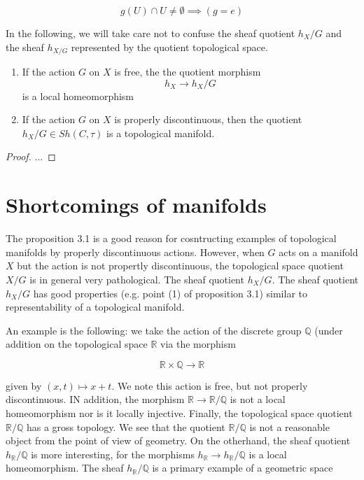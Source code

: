 \documentclass[../main.tex]{subfiles}
\begin{document}
\[
    g(U) \cap U \ne \emptyset \implies (g = e)
\]

In the following, we will take care not to confuse the sheaf quotient $h_X/G$ and the sheaf $h_{X/G}$ represented by the quotient topological space.

\begin{prop}
    \begin{enumerate}
            \item If the action $G$ on $X$ is free, the the quotient morphism
            \[h_X \to h_X/G\] is a local homeomorphism
            \item If the action $G$ on $X$ is properly discontinuous, then the quotient $h_X/G \in Sh(C, \tau)$ is a topological manifold.
    \end{enumerate}
\end{prop}
\begin{proof}
...
\end{proof}

\section{Shortcomings of manifolds}

The proposition 3.1 is a good reason for cosntructing examples of topological manifolds by properly discontinuous actions. However, when $G$ acts on a manifold $X$ but the action is not propertly discontinuous, the topological space quotient $X/G$ is in general very pathological. The sheaf quotient $h_X/G$. The sheaf quotient $h_X/G$ has good properties (e.g. point (1) of proposition 3.1) similar to representability of a topological manifold.

An example is the following: we take the action of the discrete group $\mathbb Q$ (under addition on the topological space $\mathbb R$ via the morphism

\[\mathbb R \times \mathbb Q \to \mathbb R\]

given by $(x, t) \mapsto x + t$. We note this action is free, but not properly discontinuous. IN addition, the morphism $\mathbb R \to \mathbb R / \mathbb Q$ is not a local homeomorphism nor is it locally injective. Finally, the topological space quotient $\mathbb R / \mathbb Q$ has a gross topology. We see that the quotient $\mathbb R/ \mathbb Q$ is not a reasonable object from the point of view of geometry. On the otherhand, the sheaf quotient $h_\mathbb R/\mathbb Q$ is more interesting, for the morphisms $h_\mathbb R \to h_\mathbb R / \mathbb Q$ is a local homeomorphism. The sheaf $h_\mathbb R / \mathbb Q$ is a primary example of a geometric space
\end{document}
